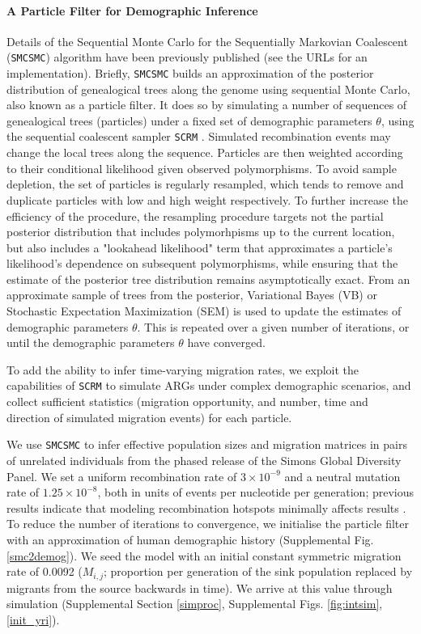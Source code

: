 \documentclass{article}
\begin{document}
\paragraph{A Particle Filter for Demographic Inference} Details of the Sequential Monte Carlo for the Sequentially Markovian Coalescent ({\tt SMCSMC}) algorithm have been previously published \cite{Henderson2018} (see the URLs for an implementation). Briefly, {\tt SMCSMC} builds an approximation of the posterior distribution of genealogical trees along the genome using sequential Monte Carlo, also known as a particle filter. It does so by simulating a number of sequences of genealogical trees (particles) under a fixed set of demographic parameters $\theta$, using the sequential coalescent sampler {\tt SCRM} \cite{Staab2015}. Simulated recombination events may change the local trees along the sequence. Particles are then weighted according to their conditional likelihood given observed polymorphisms.  To avoid sample depletion, the set of particles is regularly resampled, which tends to remove and duplicate particles with low and high weight respectively.  To further increase the efficiency of the procedure, the
resampling procedure targets not the partial posterior distribution that includes polymorhpisms up to the current location,
but also includes a "lookahead likelihood" term that approximates a particle's likelihood's dependence on subsequent polymorphisms,
while ensuring that the estimate of the posterior tree distribution remains asymptotically exact.  From an approximate sample
of trees from the posterior, Variational Bayes (VB) or Stochastic Expectation Maximization (SEM) is used to update the estimates of demographic parameters $\theta$. This is repeated over a given number of iterations, or until the demographic parameters $\theta$ have converged.

To add the ability to infer time-varying migration rates, we exploit the capabilities of {\tt SCRM} to simulate ARGs under complex demographic scenarios, and collect sufficient statistics (migration opportunity, and number, time and direction of simulated migration events) for each particle.

We use {\tt SMCSMC} to infer effective population sizes and migration matrices in pairs of unrelated individuals from the phased release of the Simons Global Diversity Panel. We set a uniform recombination rate of $3\times10^{-9}$ and a neutral mutation rate of $1.25\times10^{-8}$, both in units of events per nucleotide per generation; previous results indicate that modeling recombination
hotspots minimally affects results \cite{Li2011}. To reduce the number of iterations to convergence, we initialise the particle filter with an approximation of human demographic history (Supplemental Fig. \ref{smc2demog}).
We seed the model with an initial constant symmetric  migration rate of 0.0092 ($M_{i,j}$; proportion per generation of the sink population replaced by migrants from the source backwards in time). We arrive at this value through simulation (Supplemental Section \ref{simproc}, Supplemental Figs. \ref{fig:intsim}, \ref{init_yri}).
\end{document}
